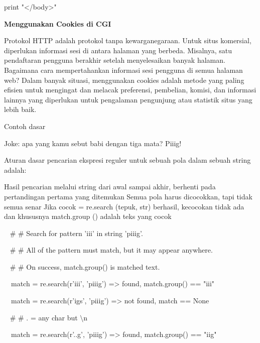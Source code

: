 \begin{12pt}
\begin{12pt}
\noindent 
print "</body>" \par
\vspace{12pt}
\noindent 
{\fontsize{14pt}{14pt}\selectfont \textbf{Menggunakan Cookies di CGI} \\} \par
\noindent 
Protokol HTTP adalah protokol tanpa kewarganegaraan. Untuk situs komersial, diperlukan informasi sesi di antara halaman yang berbeda. Misalnya, satu pendaftaran pengguna berakhir setelah menyelesaikan banyak halaman. Bagaimana cara mempertahankan informasi sesi pengguna di semua halaman web? Dalam banyak situasi, menggunakan cookies adalah metode yang paling efisien untuk mengingat dan melacak preferensi, pembelian, komisi, dan informasi lainnya yang diperlukan untuk pengalaman pengunjung atau statistik situs yang lebih baik. \par
\noindent 
Contoh dasar \par
\noindent 
Joke: apa yang kamu sebut babi dengan tiga mata? Piiig! \par
\vspace{12pt}
\noindent 
Aturan dasar pencarian ekspresi reguler untuk sebuah pola dalam sebuah string adalah: \par
\noindent 
Hasil pencarian melalui string dari awal sampai akhir, berhenti pada pertandingan pertama yang ditemukan  Semua pola harus dicocokkan, tapi tidak semua senar Jika cocok = re.search (tepuk, str) berhasil, kecocokan tidak ada dan khususnya match.group () adalah teks yang cocok \par
\vspace{12pt}
\noindent 
~  $  \#  $ $  \#  $ Search for pattern 'iii' in string 'piiig'. \par
\noindent 
~  $  \#  $ $  \#  $ All of the pattern must match, but it may appear anywhere. \par
\noindent 
~  $  \#  $ $  \#  $ On success, match.group() is matched text. \par
\noindent 
~~match = re.search(r'iii', 'piiig') =>  found, match.group() == "iii" \par
\noindent 
~~match = re.search(r'igs', 'piiig') =>  not found, match == None \par
\vspace{12pt}
\noindent 
~  $  \#  $ $  \#  $ . = any char but  $  \setminus  $n \par
\noindent 
~~match = re.search(r'..g', 'piiig') =>  found, match.group() == "iig" \par
\vspace{12pt}

\end{12pt}
\end{12pt}
